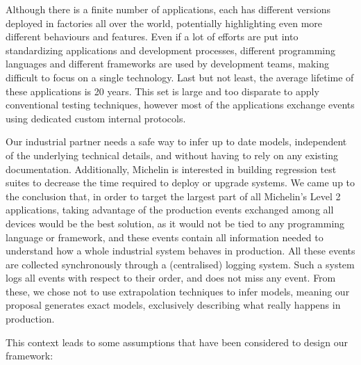 Although there is a finite number of applications, each has
different versions deployed in factories all over the world,
potentially highlighting even more different behaviours and
features. Even if a lot of efforts are put into standardizing
applications and development processes, different programming
languages and different frameworks are used by development
teams, making difficult to focus on a single technology. Last
but not least, the average lifetime of these applications is 20
years. This set is large and too disparate to apply conventional
testing techniques, however most of the applications exchange
events using dedicated custom internal protocols.

Our industrial partner needs a safe way to infer up to date
models, independent of the underlying technical details, and
without having to rely on any existing documentation.
Additionally, Michelin is interested in building regression test
suites to decrease the time required to deploy or upgrade
systems. We came up to the conclusion that, in order to target
the largest part of all Michelin's Level 2 applications, taking
advantage of the production events exchanged among all devices
would be the best solution, as it would not be tied to any
programming language or framework, and these events contain all
information needed to understand how a whole industrial system
behaves in production. All these events are collected
synchronously through a (centralised) logging system. Such a
system logs all events with respect to their order, and does not
miss any event.  From these, we chose not to use extrapolation
techniques to infer models, meaning our proposal generates exact
models, exclusively describing what really happens in production.

This context leads to some assumptions that have been considered
to design our framework:

